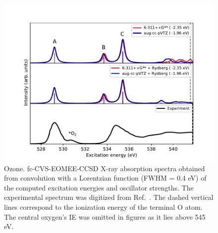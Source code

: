\documentclass[journal=jctcce,manuscript=article]{achemso}
\begin{document}
\begin{figure}
  \includegraphics[width=1\textwidth]{Spectra/O3.pdf}  
  \caption{Ozone. fc-CVS-EOMEE-CCSD X-ray absorption spectra obtained from convolution with a Lorentzian function (FWHM = 0.4 eV) of the computed excitation energies and oscillator strengths. The experimental spectrum was digitized from Ref.~. The dashed vertical lines correspond to the ionization energy of the terminal O atom. The central oxygen's IE was omitted in figures as it lies above 545 eV.}
  \label{fgr:Ozone}
\end{figure}
\end{document}

